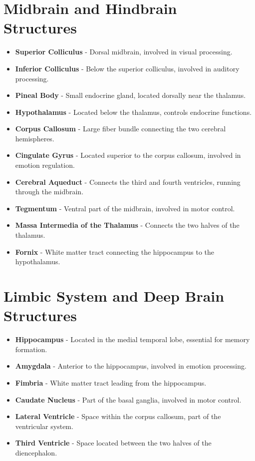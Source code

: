 \section{Midbrain and Hindbrain Structures}
\begin{itemize}
    \item \textbf{Superior Colliculus} - Dorsal midbrain, involved in visual processing.
    \item \textbf{Inferior Colliculus} - Below the superior colliculus, involved in auditory processing.
    \item \textbf{Pineal Body} - Small endocrine gland, located dorsally near the thalamus.
    \item \textbf{Hypothalamus} - Located below the thalamus, controls endocrine functions.
    \item \textbf{Corpus Callosum} - Large fiber bundle connecting the two cerebral hemispheres.
    \item \textbf{Cingulate Gyrus} - Located superior to the corpus callosum, involved in emotion regulation.
    \item \textbf{Cerebral Aqueduct} - Connects the third and fourth ventricles, running through the midbrain.
    \item \textbf{Tegmentum} - Ventral part of the midbrain, involved in motor control.
    \item \textbf{Massa Intermedia of the Thalamus} - Connects the two halves of the thalamus.
    \item \textbf{Fornix} - White matter tract connecting the hippocampus to the hypothalamus.
\end{itemize}

\section{Limbic System and Deep Brain Structures}
\begin{itemize}
    \item \textbf{Hippocampus} - Located in the medial temporal lobe, essential for memory formation.
    \item \textbf{Amygdala} - Anterior to the hippocampus, involved in emotion processing.
    \item \textbf{Fimbria} - White matter tract leading from the hippocampus.
    \item \textbf{Caudate Nucleus} - Part of the basal ganglia, involved in motor control.
    \item \textbf{Lateral Ventricle} - Space within the corpus callosum, part of the ventricular system.
    \item \textbf{Third Ventricle} - Space located between the two halves of the diencephalon.
\end{itemize}

